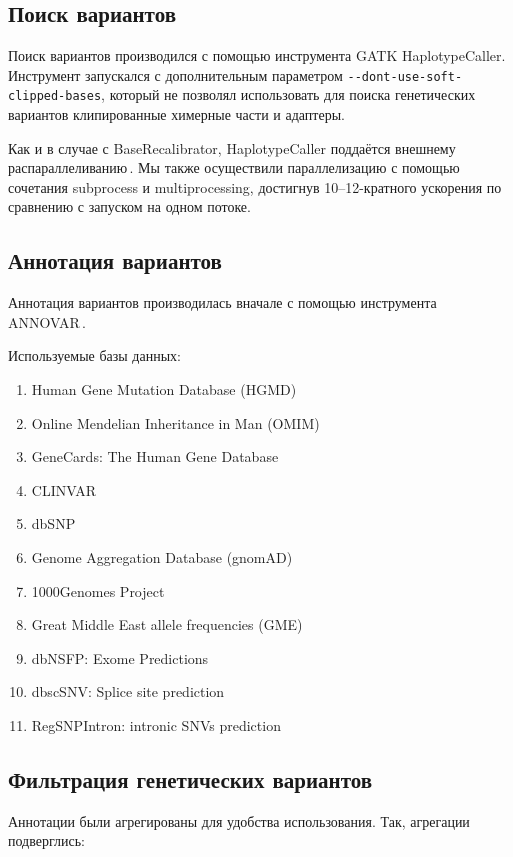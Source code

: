 \documentclass[12pt, twoside, a4paper]{article}
\newcommand{\utilname}[1]{\textenglish{#1}}
\begin{document}
\subsection{Поиск вариантов}
Поиск вариантов производился с помощью инструмента \utilname{GATK HaplotypeCaller}.
Инструмент запускался с дополнительным параметром \verb|--dont-use-soft-clipped-bases|, который не позволял использовать для поиска генетических вариантов клипированные химерные части и адаптеры.

Как и в случае с \utilname{BaseRecalibrator}, \utilname{HaplotypeCaller} поддаётся внешнему распараллеливанию\,\cite{Heldenbrand_2019}.
Мы также осуществили параллелизацию с помощью сочетания \utilname{subprocess} и \utilname{multiprocessing}, достигнув 10--12-кратного ускорения по сравнению с запуском на одном потоке.

\subsection{Аннотация вариантов}
Аннотация вариантов производилась вначале с помощью инструмента \utilname{ANNOVAR}\,\cite{Wang_2010}.

Используемые базы данных:

\begin{enumerate}
	\item Human Gene Mutation Database (HGMD\textregistered)\,\cite{Stenson_2017}
	\item Online Mendelian Inheritance in Man (OMIM\textregistered)\,\cite{Amberger_2014}
	\item GeneCards\textregistered: The Human Gene Database\,\cite{Stelzer_2016}
	\item CLINVAR\,\cite{Landrum_2017}
	\item dbSNP\,\cite{Sherry_2001}
	\item Genome Aggregation Database (gnomAD)\,\cite{Karczewski_2020}
	\item 1000Genomes Project\,\cite{Auton_2015}
	\item Great Middle East allele frequencies (GME)\,\cite{Scott_2016}
	\item dbNSFP: Exome Predictions\,\cite{Liu_2016}
	\item dbscSNV: Splice site prediction\,\cite{Jian_2013}
	\item RegSNPIntron: intronic SNVs prediction\,\cite{Lin_2019}
\end{enumerate}

\subsection{Фильтрация генетических вариантов}
Аннотации были агрегированы для удобства использования.
Так, агрегации подверглись:
\end{document}
